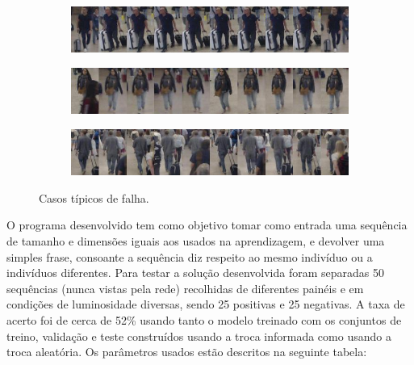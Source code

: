\begin{figure} [h]
  \centering
  \begin{subfigure}{13.5cm}
    \centering\includegraphics[width=13.5cm]{erro_troca_boa.jpg}
    \caption{}
  \end{subfigure}
  \begin{subfigure}{13.5cm}
    \centering\includegraphics[width=13.5cm]{erro_peq_ruido.jpg}
    \caption{}
  \end{subfigure}
  \begin{subfigure}{13.5cm}
    \centering\includegraphics[width=13.5cm]{erro_grande_ruido.jpg}
    \caption{}
  \end{subfigure}
  \caption{Casos típicos de falha.}
  \label{fig:falha}
\end{figure}

\noindent O programa desenvolvido tem como objetivo tomar como entrada uma sequência de tamanho e dimensões iguais aos usados na aprendizagem, e devolver uma simples frase, consoante a sequência diz respeito ao mesmo indivíduo ou a indivíduos diferentes.\newline
\noindent Para testar a solução desenvolvida foram separadas 50 sequências (nunca vistas pela rede) recolhidas de diferentes painéis e em condições de luminosidade diversas, sendo 25 positivas e 25 negativas.\newline
\noindent A taxa de acerto foi de cerca de 52\% usando tanto o modelo treinado com os conjuntos de treino, validação e teste construídos usando a troca informada como usando a troca aleatória. Os parâmetros usados estão descritos na seguinte tabela:

